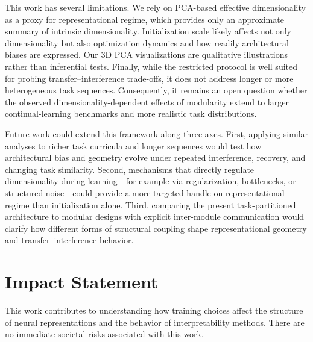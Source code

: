 \documentclass{article}
\theoremstyle{plain}
\theoremstyle{definition}
\theoremstyle{remark}
\begin{document}
This work has several limitations. We rely on PCA-based effective dimensionality as a proxy for representational regime, which provides only an approximate summary of intrinsic dimensionality. Initialization scale likely affects not only dimensionality but also optimization dynamics and how readily architectural biases are expressed. Our 3D PCA visualizations are qualitative illustrations rather than inferential tests. Finally, while the restricted protocol is well suited for probing transfer–interference trade-offs, it does not address longer or more heterogeneous task sequences. Consequently, it remains an open question whether the observed dimensionality-dependent effects of modularity extend to larger continual-learning benchmarks and more realistic task distributions.

Future work could extend this framework along three axes. First, applying similar analyses to richer task curricula and longer sequences would test how architectural bias and geometry evolve under repeated interference, recovery, and changing task similarity. Second, mechanisms that directly regulate dimensionality during learning—for example via regularization, bottlenecks, or structured noise—could provide a more targeted handle on representational regime than initialization alone. Third, comparing the present task-partitioned architecture to modular designs with explicit inter-module communication would clarify how different forms of structural coupling shape representational geometry and transfer–interference behavior.
\section*{Impact Statement}

This work contributes to understanding how training choices affect the structure of neural representations and the behavior of interpretability methods. There are no immediate societal risks associated with this work.



\end{document}
